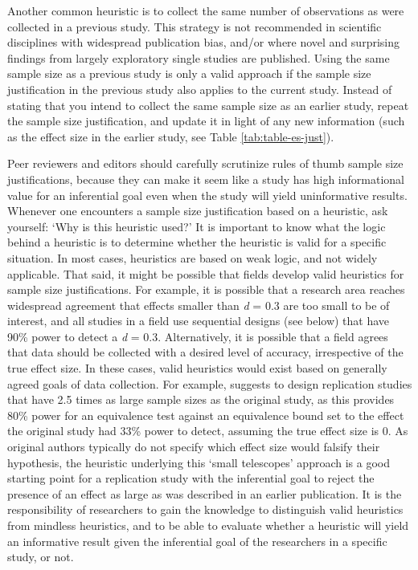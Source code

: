 \documentclass[
  oneside]{krantz}
\begin{document}
Another common heuristic is to collect the same number of observations as were collected in a previous study. This strategy is not recommended in scientific disciplines with widespread publication bias, and/or where novel and surprising findings from largely exploratory single studies are published. Using the same sample size as a previous study is only a valid approach if the sample size justification in the previous study also applies to the current study. Instead of stating that you intend to collect the same sample size as an earlier study, repeat the sample size justification, and update it in light of any new information (such as the effect size in the earlier study, see Table \ref{tab:table-es-just}).

Peer reviewers and editors should carefully scrutinize rules of thumb sample size justifications, because they can make it seem like a study has high informational value for an inferential goal even when the study will yield uninformative results. Whenever one encounters a sample size justification based on a heuristic, ask yourself: `Why is this heuristic used?' It is important to know what the logic behind a heuristic is to determine whether the heuristic is valid for a specific situation. In most cases, heuristics are based on weak logic, and not widely applicable. That said, it might be possible that fields develop valid heuristics for sample size justifications. For example, it is possible that a research area reaches widespread agreement that effects smaller than \emph{d} = 0.3 are too small to be of interest, and all studies in a field use sequential designs (see below) that have 90\% power to detect a \emph{d} = 0.3. Alternatively, it is possible that a field agrees that data should be collected with a desired level of accuracy, irrespective of the true effect size. In these cases, valid heuristics would exist based on generally agreed goals of data collection. For example, \citet{simonsohn_small_2015} suggests to design replication studies that have 2.5 times as large sample sizes as the original study, as this provides 80\% power for an equivalence test against an equivalence bound set to the effect the original study had 33\% power to detect, assuming the true effect size is 0. As original authors typically do not specify which effect size would falsify their hypothesis, the heuristic underlying this `small telescopes' approach is a good starting point for a replication study with the inferential goal to reject the presence of an effect as large as was described in an earlier publication. It is the responsibility of researchers to gain the knowledge to distinguish valid heuristics from mindless heuristics, and to be able to evaluate whether a heuristic will yield an informative result given the inferential goal of the researchers in a specific study, or not.
\end{document}
